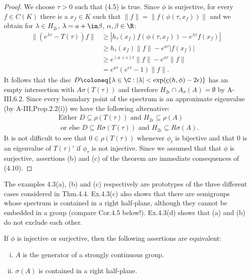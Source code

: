 \begin{proof}
	We choose $\tau > 0$ such that (4.5) is true.
	Since $\phi$ is surjective, for every $f \in C(K)$ there is a $x_{f} \in K$ such that $\|f\| = \|f(\phi(\tau,x_{f}))\|$ and we obtain for $\lambda \in H_{2\epsilon}$, $\lambda = a + \im\beta$, $\alpha,\beta \in \R$:
	\begin{equation}\label{eq:b3-4.9}
		\begin{aligned}
			\|(e^{\lambda\tau} - T(\tau))f\| &\geq |h_{\tau}(x_{f})f(\phi(\tau,x_{f})) - e^{\lambda\tau}f(x_{f})| \\
			&\geq h_{\tau}(x_{f})\|f\| - e^{a\tau}|f(x_{f})| \\
			&\geq e^{(a+\epsilon)\tau}\|f\| - e^{a\tau}\|f\| \\
			&= e^{a\tau}(e^{\epsilon\tau} - 1)\|f\|.
		\end{aligned}
	\end{equation}
	It follows that the disc $D \coloneq \{\lambda \in \C : |\lambda| < \exp(\underbar{c}(h,\phi)-2\epsilon)\}$ has an empty intersection with $A{\sigma}(T(\tau))$ and therefore $H_{2\epsilon}\cap A_{\sigma}(A) = \emptyset$ by A-III,6.2.
	Since every boundary point of the spectrum is an approximate eigenvalue (by A-III,Prop.2.2(i)) we have the following alternative:
	\begin{equation}\label{eq:b3-4.10}
		\begin{aligned}
		&\text{Either } D \subseteq \rho(T(\tau)) \text{ and } H_{2\epsilon} \subseteq \rho(A) \\
		&\text{ or else } D \subseteq R{\sigma}(T(\tau)) \text{ and } H_{2\epsilon} \subseteq R{\sigma}(A).
	\end{aligned}
	\end{equation}
	It is not difficult to see that $0 \in \rho(T(\tau))$ whenever $\phi_{t}$ is bijective and that $0$ is an eigenvalue of $T(\tau)'$ if $\phi_{\tau}$ is not injective.
	Since we assumed that that $\phi$ is surjective, assertions (b) and (c) of the theorem are immediate consequences of (4.10).
\end{proof}
The examples 4.3(a), (b) and (c) respectively are prototypes of the three different cases considered in Thm.4.4.
Ex.4.3(c) also shows that there are semigroups whose spectrum is contained in a right half-plane, although they cannot be embedded in a group (compare Cor.4.5 below!).
Ex.4.3(d) shows that (a) and (b) do not exclude each other.
\begin{corollary}\label{cor:b3-4.5}
	If $\phi$ is injective or surjective, then the following assertions are equivalent:
	\begin{enumerate}[(i)]
		\item 
		$A$ is the generator of a strongly continuous group.
		
		\item 
		$\sigma(A)$ is contained in a right half-plane.
	\end{enumerate}
\end{corollary}
